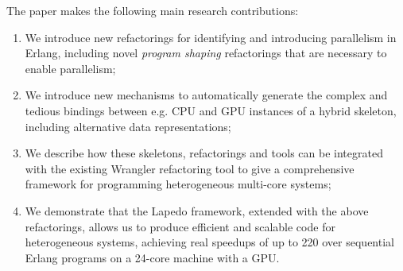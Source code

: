 \documentclass[final]{jfp1}
\newcommand{\lapedo}{\xspace{\sc Lapedo}\xspace}
\newcommand{\Lapedo}{\lapedo}
\begin{document}
The paper makes the following main research contributions:
\begin{enumerate}
\item
We introduce new refactorings for identifying and introducing parallelism in Erlang, including novel
\emph{program shaping} refactorings that are necessary to enable parallelism;
\item
We introduce new mechanisms to automatically generate the complex and tedious bindings between e.g.
CPU and GPU instances of a hybrid skeleton, including alternative data representations;
\item
We describe how these skeletons, refactorings and tools can be integrated with the existing
Wrangler refactoring tool to give a comprehensive framework for programming heterogeneous
multi-core systems;
\item
We demonstrate that the \Lapedo{} framework, extended with the above refactorings, allows us to produce efficient and scalable code for heterogeneous systems,
achieving real speedups of up to 220 over sequential Erlang programs on a 24-core machine with a GPU.
\end{enumerate}
\end{document}
